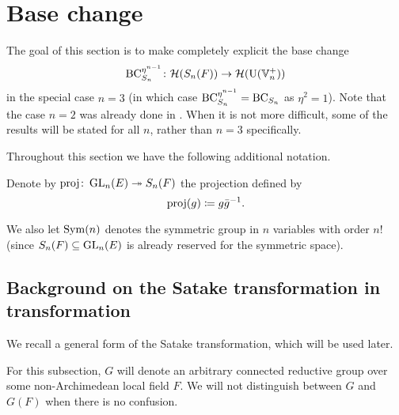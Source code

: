 \chapter{Base change}
\label{ch:satake}

The goal of this section is to make completely explicit the base change
\[ \operatorname{BC}_{S_n}^{\eta^{n-1}} \colon \mathcal H(S_n(F)) \to \mathcal H(\operatorname{U}(\mathbb V_n^+)) \]
in the special case $n = 3$ (in which case $\operatorname{BC}_{S_n}^{\eta^{n-1}} = \operatorname{BC}_{S_n}$ as $\eta^2 = 1$).
Note that the case $n = 2$ was already done in \cite[\S7.1]{ref:AFLspherical}.
When it is not more difficult, some of the results will be stated for all $n$,
rather than $n = 3$ specifically.

Throughout this section we have the following additional notation.
\begin{definition}
  Denote by $\operatorname{proj} \colon \operatorname{GL}_n(E) \twoheadrightarrow S_n(F)$ the projection defined by
  \[ \operatorname{proj}(g) \coloneqq g \bar{g}^{-1}. \]
\end{definition}
We also let $\operatorname{Sym}(n)$ denotes the symmetric group in $n$ variables with order $n!$
(since $S_n(F) \subseteq \operatorname{GL}_n(E)$ is already reserved for the symmetric space).

\section{Background on the Satake transformation in transformation}
We recall a general form of the Satake transformation, which will be used later.

For this subsection, $G$ will denote an arbitrary connected reductive group
over some non-Archimedean local field $F$.
We will not distinguish between $G$ and $G(F)$ when there is no confusion.

